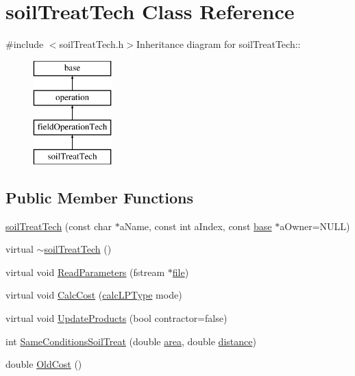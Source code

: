 \hypertarget{classsoil_treat_tech}{
\section{soilTreatTech Class Reference}
\label{classsoil_treat_tech}
}


{\ttfamily \#include $<$soilTreatTech.h$>$}Inheritance diagram for soilTreatTech::\begin{figure}[H]
\begin{center}
\leavevmode
\includegraphics[height=4cm]{classsoil_treat_tech}
\end{center}
\end{figure}
\subsection*{Public Member Functions}
\begin{DoxyCompactItemize}
\item 
\hyperlink{classsoil_treat_tech_a4c26ebd0f19485caa234d5331b440cf3}{soilTreatTech} (const char $\ast$aName, const int aIndex, const \hyperlink{classbase}{base} $\ast$aOwner=NULL)
\item 
virtual \hyperlink{classsoil_treat_tech_ad59b0663ed3e4f6510c52b943e8eb028}{$\sim$soilTreatTech} ()
\item 
virtual void \hyperlink{classsoil_treat_tech_a43342c7563137af6f07fd4b031f3c599}{ReadParameters} (fstream $\ast$\hyperlink{classbase_a3af52ee9891719d09b8b19b42450b6f6}{file})
\item 
virtual void \hyperlink{classsoil_treat_tech_a988dd9310b22be5d36a28cdaa1dcc805}{CalcCost} (\hyperlink{typer_8h_af05cf854fc14086a0d6404be5ae9813f}{calcLPType} mode)
\item 
virtual void \hyperlink{classsoil_treat_tech_aea3565eebbd55354cbee50d13c1c892a}{UpdateProducts} (bool contractor=false)
\item 
int \hyperlink{classsoil_treat_tech_a77cc5c86d535e4982c10ca67ecedb28a}{SameConditionsSoilTreat} (double \hyperlink{classfield_operation_tech_a4577ac12831e5d317301920b7e26de69}{area}, double \hyperlink{classfield_operation_tech_a632ea22d4eb656dc9a2e44a2e5b0864c}{distance})
\item 
double \hyperlink{classsoil_treat_tech_afc70675f94061c67fdcc613397b512f1}{OldCost} ()
\end{DoxyCompactItemize}
